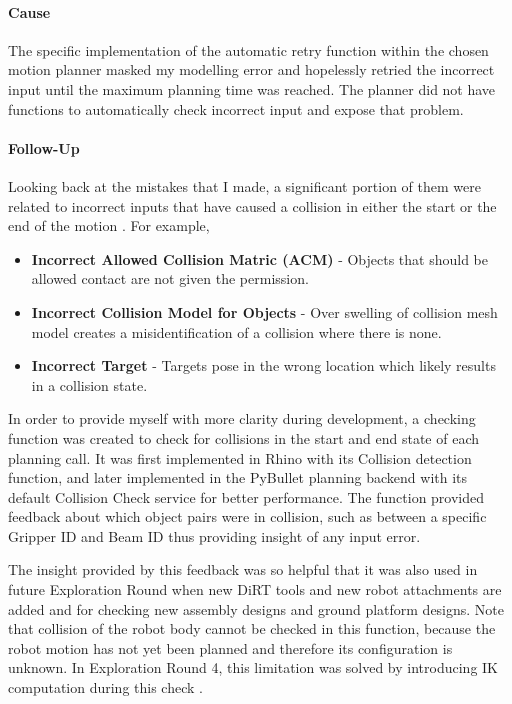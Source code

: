 \paragraph{Cause}

The specific implementation of the automatic retry function within the chosen motion planner masked my modelling error and hopelessly retried the incorrect input until the maximum planning time was reached. The planner did not have functions to automatically check incorrect input and expose that problem.

\paragraph{Follow-Up}

Looking back at the mistakes that I made, a significant portion of them were related to incorrect inputs that have caused a collision in either the start or the end of the motion . For example, 

\begin{itemize}[nosep]
    \item \textbf{Incorrect Allowed Collision Matric (ACM)} - Objects that should be allowed contact are not given the permission.
    \item \textbf{Incorrect Collision Model for Objects} - Over swelling of collision mesh model creates a misidentification of a collision where there is none.
    \item \textbf{Incorrect Target} - Targets pose in the wrong location which likely results in a collision state.
\end{itemize}

In order to provide myself with more clarity during development, a checking function was created to check for collisions in the start and end state of each planning call. It was first implemented in Rhino with its Collision detection function, and later implemented in the PyBullet planning backend \parencite{coumansPyBulletPythonModule2016, huangCompas_fab_pychoreo2023} with its default Collision Check service for better performance. The function provided feedback about which object pairs were in collision, such as between a specific Gripper ID and Beam ID thus providing insight of any input error.

The insight provided by this feedback was so helpful that it was also used in future Exploration Round when new DiRT tools and new robot attachments are added and for checking new assembly designs and ground platform designs.
Note that collision of the robot body cannot be checked in this function, because the robot motion has not yet been planned and therefore its configuration is unknown. In Exploration Round 4, this limitation was solved by introducing IK computation during this check .

